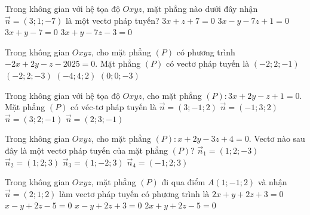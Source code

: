 \begin{ex}%
	Trong không gian  với hệ tọa độ $Oxyz$, mặt phẳng nào dưới đây nhận\break $\overrightarrow{n} = (3;1;-7)$ là một vectơ pháp tuyến?
	\choice 
		{$3x + z  + 7 = 0$}
		{$3x - y - 7z + 1 = 0$} 
		{$3x + y - 7 =  0$}
		{\True $3x + y - 7z - 3 =  0$}
\end{ex}

\begin{ex}%
	Trong không gian  $Oxyz$, cho mặt phẳng $(P)$ có phương trình $-2 x+2 y-z-2025=0$. Mặt phẳng $(P)$ có vectơ pháp tuyến là
	\choice 
		{\True $(-2;  2;-1)$}
		{$(-2; 2;-3)$} 
		 {$(-4; 4; 2)$}
		 {$(0; 0;-3)$}
\end{ex}

\begin{ex}%
	Trong không gian  với hệ tọa độ $Oxyz$, cho mặt phẳng $(P)\colon 3x+2y-z+1=0$. Mặt phẳng $(P)$ có véc-tơ pháp tuyến là
	\choice 
		 {$\overrightarrow{n}=(3;-1;2)$}
		{$\overrightarrow{n}=(-1;3;2)$} 
		{\True$\overrightarrow{n}=(3;2;-1)$} 
		 {$\overrightarrow{n}=(2;3;-1)$}
\end{ex}

\begin{ex}%
	Trong không gian $Oxyz$, cho mặt phẳng $(P) \colon x+2y-3z+4=0$. Vectơ nào sau đây là một vectơ pháp tuyến của  mặt phẳng $(P)$?
	\choice 
		 {\True $\overrightarrow{n}_1=(1;2;-3)$}
		 {$\overrightarrow{n}_2=(1;2;3)$}
		 {$\overrightarrow{n}_3=(1;-2;3)$}
		{$\overrightarrow{n}_4=(-1;2;3)$} 
\end{ex}

\begin{ex}%
	Trong không  gian $Oxyz$, mặt phẳng $(P)$ đi qua điểm $A(1;-1;2)$ và nhận $\overrightarrow{n}=(2;1;2)$ làm vectơ pháp tuyến có phương trình là
	\choice 
		{$2x+y+2z+3=0$} 
		 {$x-y+2z-5=0$}
		 {$x-y+2z+3=0$}
		 {\True $2x+y+2z-5=0$}
\end{ex}

